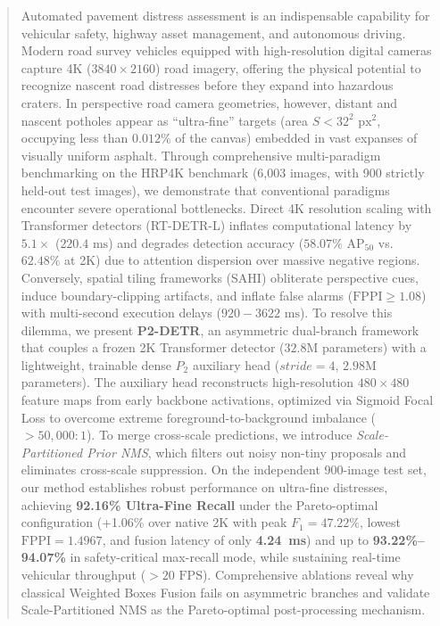 \documentclass[runningheads]{llncs}
\begin{document}
\begin{abstract}
Automated pavement distress assessment is an indispensable capability for vehicular safety, highway asset management, and autonomous driving. Modern road survey vehicles equipped with high-resolution digital cameras capture 4K ($3840 \times 2160$) road imagery, offering the physical potential to recognize nascent road distresses before they expand into hazardous craters. In perspective road camera geometries, however, distant and nascent potholes appear as ``ultra-fine'' targets (area $S < 32^2\text{ px}^2$, occupying less than $0.012\%$ of the canvas) embedded in vast expanses of visually uniform asphalt. Through comprehensive multi-paradigm benchmarking on the HRP4K benchmark (6,003 images, with 900 strictly held-out test images), we demonstrate that conventional paradigms encounter severe operational bottlenecks. Direct 4K resolution scaling with Transformer detectors (RT-DETR-L) inflates computational latency by $5.1\times$ ($220.4\text{ ms}$) and degrades detection accuracy ($58.07\% \text{ AP}_{50}$ vs. $62.48\%$ at 2K) due to attention dispersion over massive negative regions. Conversely, spatial tiling frameworks (SAHI) obliterate perspective cues, induce boundary-clipping artifacts, and inflate false alarms ($\text{FPPI} \ge 1.08$) with multi-second execution delays ($920 - 3622\text{ ms}$). To resolve this dilemma, we present \textbf{P2-DETR}, an asymmetric dual-branch framework that couples a frozen 2K Transformer detector ($32.8\text{M}$ parameters) with a lightweight, trainable dense $P_2$ auxiliary head ($stride=4$, $2.98\text{M}$ parameters). The auxiliary head reconstructs high-resolution $480 \times 480$ feature maps from early backbone activations, optimized via Sigmoid Focal Loss to overcome extreme foreground-to-background imbalance ($>50,000 : 1$). To merge cross-scale predictions, we introduce \textit{Scale-Partitioned Prior NMS}, which filters out noisy non-tiny proposals and eliminates cross-scale suppression. On the independent 900-image test set, our method establishes robust performance on ultra-fine distresses, achieving \textbf{92.16\% Ultra-Fine Recall} under the Pareto-optimal configuration (+1.06\% over native 2K with peak $F_1 = 47.22\%$, lowest $\text{FPPI} = 1.4967$, and fusion latency of only \textbf{4.24~ms}) and up to \textbf{93.22\%--94.07\%} in safety-critical max-recall mode, while sustaining real-time vehicular throughput ($>20\text{ FPS}$). Comprehensive ablations reveal why classical Weighted Boxes Fusion fails on asymmetric branches and validate Scale-Partitioned NMS as the Pareto-optimal post-processing mechanism.

\end{abstract}
\end{document}
